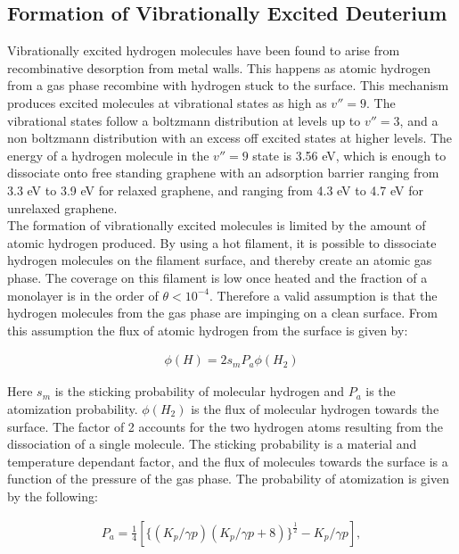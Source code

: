 \subsection{Formation of Vibrationally Excited Deuterium}

Vibrationally excited hydrogen molecules have been found to arise from recombinative desorption from metal walls. This happens as atomic hydrogen from a gas phase recombine with hydrogen stuck to the surface. This mechanism produces excited molecules at vibrational states as high as $v'' = 9$.\cite{PhysRevLett.60.337} The vibrational states follow a boltzmann distribution at levels up to $v'' = 3$, and a non boltzmann distribution with an excess off excited states at higher levels. The energy of a hydrogen molecule in the $v'' =9$ state is 3.56 eV, which is enough to dissociate onto free standing graphene with an adsorption barrier ranging from 3.3 eV to 3.9 eV for relaxed graphene, and ranging from 4.3 eV to 4.7 eV for unrelaxed graphene.\cite{:/content/aip/journal/jap/93/6/10.1063/1.1555701}\\
The formation of vibrationally excited molecules is limited by the amount of atomic hydrogen produced. By using a hot filament, it is possible to dissociate hydrogen molecules on the filament surface, and thereby create an atomic gas phase. The coverage on this filament is low once heated and the fraction of a monolayer is in the order of $\theta < 10^{-4}$.\cite{PhysRevLett.60.341} Therefore a valid assumption is that the hydrogen molecules from the gas phase are impinging on a clean surface. From this assumption the flux of atomic hydrogen from the surface is given by:\cite{PhysRevLett.60.341}

\begin{align}
  \phi (H) = 2 s_m P_a \phi (H_2)
\end{align}

Here $s_m$ is the sticking probability of molecular hydrogen and $P_a$ is the atomization probability. $\phi(H_2)$ is the flux of molecular hydrogen towards the surface. The factor of 2 accounts for the two hydrogen atoms resulting from the dissociation of a single molecule. The sticking probability is a material and temperature dependant factor, and the flux of molecules towards the surface is a function of the pressure of the gas phase. The probability of atomization is given by the following:\cite{PhysRevLett.60.341}

\begin{align}
  P_a = \frac{1}{4} [\{(K_p/\gamma p)(K_p / \gamma p + 8)\}^{\frac{1}{2}} -K_p/\gamma p],
\end{align}

